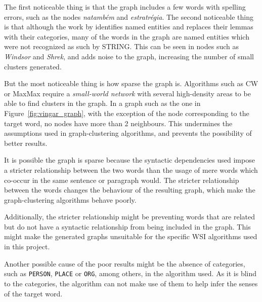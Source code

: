 The first noticeable thing is that the graph includes a few words with spelling
errors, such as the nodes \emph{natambém} and \emph{estratrégia}. The second 
noticeable thing is that although the work by \citet{correia2015syntax} 
identifies named entities and replaces their lemmas with their categories, many 
of the words in the graph are named entities which were not recognized as such 
by \ac{STRING}. This can be seen in nodes such as \emph{Windsor} and 
\emph{Shrek}, and adds noise to the graph, increasing the number of small 
clusters generated.

But the most noticeable thing is how sparse the graph is. Algorithms such as
\ac{CW} or MaxMax require a \emph{small-world network} with several high-density
areas to be able to find clusters in the graph. In a graph such as the one
in Figure~\ref{fig:vingar_graph}, with the exception of the node corresponding
to the target word, no nodes have more than 2 neighbours. This undermines the
assumptions used in graph-clustering algorithms, and prevents the possibility
of better results.

It is possible the graph is sparse because the syntactic dependencies used
impose a stricter relationship between the two words than the usage of mere
words which co-occur in the same sentence or paragraph would. The stricter
relationship between the words changes the behaviour of the resulting graph,
which make the graph-clustering algorithms behave poorly.

Additionally, the stricter relationship might be preventing words that are
related but do not have a syntactic relationship from being included in the
graph. This might make the generated graphs unsuitable for the specific \ac{WSI}
algorithms used in this project.

Another possible cause of the poor results might be the absence of categories, 
such as \texttt{PERSON}, \texttt{PLACE} or \texttt{ORG}, among others, in the 
algorithm used. As it is blind to the categories, the algorithm can not make 
use of them to help infer the senses of the target word.

